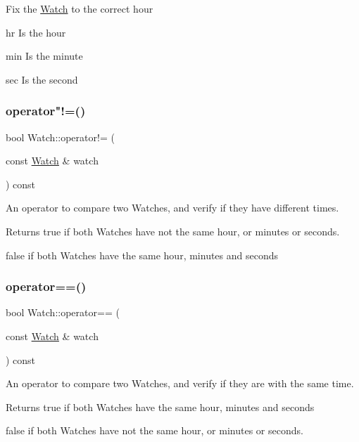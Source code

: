 Fix the \mbox{\hyperlink{classWatch}{Watch}} to the correct hour \begin{DoxyItemize}
\item hr Is the hour \item min Is the minute \item sec Is the second \end{DoxyItemize}
\mbox{\label{classWatch_abae1587719cf25b2b8628d10e6a3826d}} 
\subsubsection{\texorpdfstring{operator"!=()}{operator!=()}}
{\footnotesize\ttfamily bool Watch\+::operator!= (\begin{DoxyParamCaption}\item[{const \mbox{\hyperlink{classWatch}{Watch}} \&}]{watch }\end{DoxyParamCaption}) const}

An operator to compare two Watches, and verify if they have different times. \begin{DoxyReturn}{Returns}
true if both Watches have not the same hour, or minutes or seconds. 

false if both Watches have the same hour, minutes and seconds 
\end{DoxyReturn}
\mbox{\label{classWatch_aa985979ff68c51a6bdfb92502ee84425}} 
\subsubsection{\texorpdfstring{operator==()}{operator==()}}
{\footnotesize\ttfamily bool Watch\+::operator== (\begin{DoxyParamCaption}\item[{const \mbox{\hyperlink{classWatch}{Watch}} \&}]{watch }\end{DoxyParamCaption}) const}

An operator to compare two Watches, and verify if they are with the same time. \begin{DoxyReturn}{Returns}
true if both Watches have the same hour, minutes and seconds 

false if both Watches have not the same hour, or minutes or seconds. 
\end{DoxyReturn}
\mbox{\label{classWatch_abdffd11033da593f1e1fdbb4dca36a33}} 
